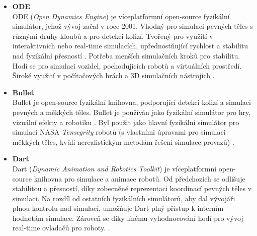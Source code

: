 \begin{itemize}
    \item \textbf{ODE}\\ \label{ODE}
        ODE (\emph{Open Dynamics Engine}) je víceplatformní open-source
        fyzikální simulátor, jehož vývoj začal v roce 2001. Vhodný pro simulaci
        pevných těles s různými druhy kloubů a pro detekci kolizí. Tvořený pro
        využití v interaktivních nebo real-time simulacích, upřednostňující
        rychlost a stabilitu nad fyzikální přesností \citep{smith2007open}.
        Potřeba menších simulačních kroků pro stabilitu. Hodí se pro simulaci
        vozidel, pochodujících robotů a virtuálních prostředí. Široké využití v
        počítačových hrách a 3D simulačních nástrojích
        \citet{coppeliarobotics}.

    \item \textbf{Bullet}\\ \label{Bullet}
        Bullet je open-source fyzikální knihovna, podporující detekci kolizí a
        simulaci pevných a měkkých těles. Bullet je používán jako fyzikální
        simulátor pro hry, vizuální efekty a robotiku \citep{coumans}. Byl použit jako hlavní
        fyzikální simulátor pro simulaci NASA \emph{Tensegrity} robotů (s
        vlastními úpravami pro simulaci měkkých těles, kvůli nerealistickým
        metodám řešení simulace provazů) \citep{izadi2018simulating}.

    \item \textbf{Dart}\\ \label{Dart}
        Dart (\emph{Dynamic Animation and Robotics Toolkit}) je víceplatformní
        open-source knihovna pro simulace a animace robotů. Od předchozích se odlišuje
        stabilitou a přesností, díky zobecněné reprezentaci koordinací pevných
        těles v simulaci. Na rozdíl od ostatních fyzikálních simulátorů, aby
        dal vývojáři plnou kontrolu nad simulací, umožňuje Dart plný přístup k
        interním hodnotám simulace. Zároveň se díky línému vyhodnocování hodí
        pro vývoj real-time ovladačů pro roboty. \citep{lee2018dart}.


\end{itemize}
